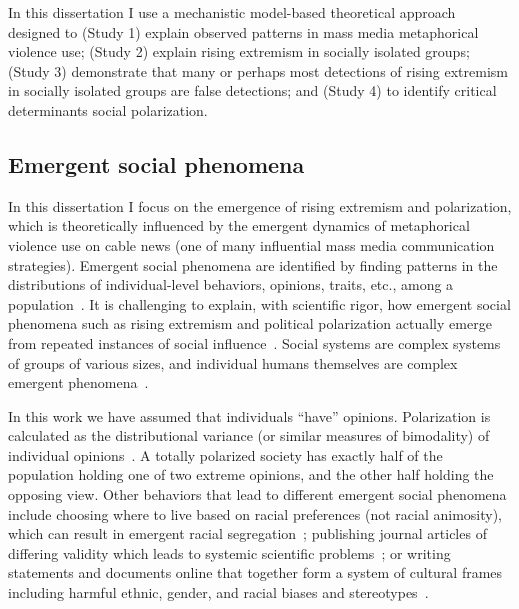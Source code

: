 In this dissertation I use a mechanistic model-based theoretical
approach designed to (Study 1) explain observed patterns in mass media metaphorical violence use;
(Study 2) explain rising extremism in socially isolated groups; (Study 3) 
demonstrate that many or perhaps most detections of
rising extremism in socially isolated groups are false detections; and 
(Study 4) to identify critical determinants social polarization.


\subsection{Emergent social phenomena}

In this dissertation I focus on the emergence of rising extremism and polarization,
which is theoretically influenced by the emergent dynamics of metaphorical violence
use on cable news (one of many influential mass media communication strategies). 
Emergent social phenomena are identified by finding patterns in
the distributions of individual-level behaviors, opinions, traits, etc., 
among a population~\cite{Blau1974,Schelling2006}. It is challenging to
explain, with scientific rigor, how emergent social phenomena such as
rising extremism and political polarization actually 
emerge from repeated instances of social influence~\cite{Watts2011}. Social systems are
complex systems of groups of various sizes, and individual humans themselves
are complex emergent phenomena~\cite{Kello2007,Lazer2009}. 

In this work we have assumed that individuals ``have'' opinions. 
Polarization is calculated 
as the distributional variance (or similar measures of bimodality) 
of individual opinions~\cite{Bramson2016}. A totally polarized society has
exactly half of the population holding one of two extreme opinions, and the
other half holding the opposing view. 
Other behaviors that lead to different emergent social phenomena 
include choosing where to live based on racial preferences (not racial animosity), 
which can result in emergent racial segregation~\cite{Schelling1971}; publishing journal 
articles of differing validity which leads to systemic scientific problems~\cite{Smaldino2019};
or writing statements and documents online that together form a system of 
cultural frames including harmful ethnic, gender, and racial biases and 
stereotypes~\cite{Caliskan2017,Garg2018}. 

